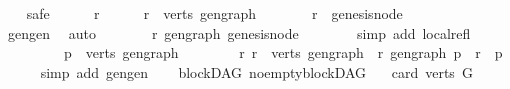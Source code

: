 \begin{isabellebody}
\ \ \isamarkupfalse%
\ safe\isanewline
\ \ \ \ \isamarkupfalse%
\ r\isanewline
\ \ \ \ \isamarkupfalse%
\ {\isachardoublequoteopen}r\ {\isasymin}\ verts\ gen{\isacharunderscore}{\kern0pt}graph{\isachardoublequoteclose}\isanewline
\ \ \ \ \isamarkupfalse%
\ \isamarkupfalse%
\ {\isachardoublequoteopen}r\ {\isacharequal}{\kern0pt}\ genesis{\isacharunderscore}{\kern0pt}node{\isachardoublequoteclose}\isanewline
\ \ \ \ \ \ \isamarkupfalse%
\ gen{\isacharunderscore}{\kern0pt}gen\ \isamarkupfalse%
\ auto\isanewline
\ \ \ \ \isamarkupfalse%
\ \isamarkupfalse%
\ {\isachardoublequoteopen}r\ {\isasymrightarrow}\isactrlsup {\isacharasterisk}{\kern0pt}\isactrlbsub gen{\isacharunderscore}{\kern0pt}graph\isactrlesub \ genesis{\isacharunderscore}{\kern0pt}node{\isachardoublequoteclose}\isanewline
\ \ \ \ \ \ \isamarkupfalse%
\ {\isacharparenleft}{\kern0pt}simp\ add{\isacharcolon}{\kern0pt}\ local{\isachardot}{\kern0pt}refl{\isacharparenright}{\kern0pt}\ \ \ \isanewline
\ \ \isamarkupfalse%
\isanewline
\ \ \isamarkupfalse%
\ \isamarkupfalse%
\ {\isachardoublequoteopen}\ {\isasymexists}p\ {\isasymin}\ verts\ gen{\isacharunderscore}{\kern0pt}graph{\isachardot}{\kern0pt}\isanewline
\ \ \ \ \ \ \ \ {\isacharparenleft}{\kern0pt}{\isasymforall}r{\isachardot}{\kern0pt}\ r\ {\isasymin}\ verts\ gen{\isacharunderscore}{\kern0pt}graph\ {\isasymlongrightarrow}\ r\ {\isasymrightarrow}\isactrlsup {\isacharplus}{\kern0pt}\isactrlbsub gen{\isacharunderscore}{\kern0pt}graph\isactrlesub \ p\ {\isasymor}\ r\ {\isacharequal}{\kern0pt}\ p{\isacharparenright}{\kern0pt}{\isachardoublequoteclose}\isanewline
\ \ \ \ \isamarkupfalse%
\ {\isacharparenleft}{\kern0pt}simp\ add{\isacharcolon}{\kern0pt}\ gen{\isacharunderscore}{\kern0pt}gen{\isacharparenright}{\kern0pt}\isanewline
{}\isamarkupfalse%
%
\endisatagproof
{\isafoldproof}%
%
\isadelimproof
\ \isanewline
%
\endisadelimproof
\isanewline
{}\isamarkupfalse%
\ {\isacharparenleft}{\kern0pt}\ blockDAG{\isacharparenright}{\kern0pt}\ no{\isacharunderscore}{\kern0pt}empty{\isacharunderscore}{\kern0pt}blockDAG{\isacharcolon}{\kern0pt}\isanewline
\ \ \ {\isachardoublequoteopen}card\ {\isacharparenleft}{\kern0pt}verts\ G{\isacharparenright}{\kern0pt}\ {\isachargreater}{\kern0pt}\ {}{\isachardoublequoteclose}\isanewline
%
\isadelimproof
%
\endisadelimproof

\end{isabellebody}
